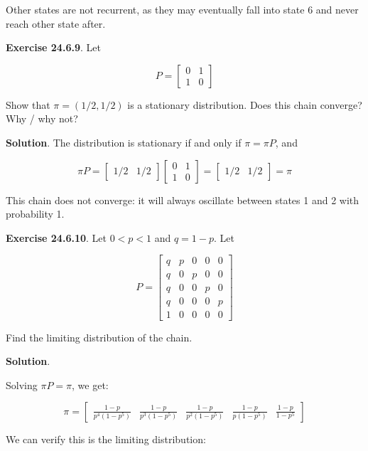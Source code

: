 Other states are not recurrent, as they may eventually fall into state 6
and never reach other state after.

\textbf{Exercise 24.6.9}. Let

\[ P = \begin{bmatrix}
0 & 1 \\
1 & 0
\end{bmatrix}\]

Show that \(\pi = (1/2, 1/2)\) is a stationary distribution. Does this
chain converge? Why / why not?

\textbf{Solution}. The distribution is stationary if and only if
\(\pi = \pi P\), and

\[ \pi P = \begin{bmatrix} 1/2 & 1/2 \end{bmatrix}
\begin{bmatrix} 0 & 1 \\ 1 & 0 \end{bmatrix}
= \begin{bmatrix} 1/2 & 1/2 \end{bmatrix} = \pi
\]

This chain does not converge: it will always oscillate between states 1
and 2 with probability 1.

\textbf{Exercise 24.6.10}. Let \(0 < p < 1\) and \(q = 1 - p\). Let

\[ P = 
\begin{bmatrix}
q & p & 0 & 0 & 0 \\
q & 0 & p & 0 & 0 \\
q & 0 & 0 & p & 0 \\
q & 0 & 0 & 0 & p \\
1 & 0 & 0 & 0 & 0
\end{bmatrix}
\]

Find the limiting distribution of the chain.

\textbf{Solution}.

Solving \(\pi P = \pi\), we get:

\[ \pi = \begin{bmatrix} 
\frac{1 - p}{p^4(1 - p^5)} &
\frac{1 - p}{p^3(1 - p^5)} &
\frac{1 - p}{p^2(1 - p^5)} &
\frac{1 - p}{p(1 - p^5)} &
\frac{1 - p}{1 - p^5}
\end{bmatrix} \]

We can verify this is the limiting distribution:


